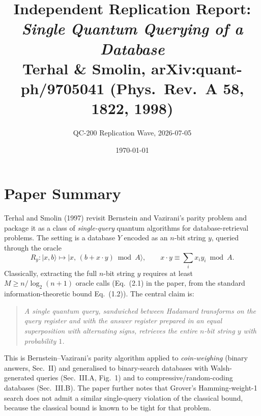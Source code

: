 \documentclass[11pt]{article}
\title{Independent Replication Report: \\
\emph{Single Quantum Querying of a Database} \\
Terhal \& Smolin, arXiv:quant-ph/9705041 (Phys.\ Rev.\ A \textbf{58}, 1822, 1998)}
\author{QC-200 Replication Wave, 2026-07-05}
\date{\today}
\begin{document}
\maketitle

\section{Paper Summary}
Terhal and Smolin (1997) revisit Bernstein and Vazirani's parity problem and
package it as a class of \emph{single-query} quantum algorithms for
database-retrieval problems. The setting is a database $Y$ encoded as an
$n$-bit string $y$, queried through the oracle
\begin{equation}
    R_y : |x,b\rangle \mapsto \bigl|x,\, (b + x\cdot y)\bmod A\bigr\rangle,
    \qquad x\cdot y \equiv \sum_i x_i y_i \bmod A .
\end{equation}
Classically, extracting the full $n$-bit string $y$ requires at least
$M \ge n/\log_2(n+1)$ oracle calls (Eq.~(2.1) in the paper, from the standard
information-theoretic bound Eq.~(1.2)). The central claim is:

\begin{quote}
\textit{A single quantum query, sandwiched between Hadamard transforms on the
query register and with the answer register prepared in an equal
superposition with alternating signs, retrieves the entire $n$-bit string $y$
with probability $1$.}
\end{quote}

This is Bernstein--Vazirani's parity algorithm applied to \emph{coin-weighing}
(binary answers, Sec.~II) and generalised to binary-search databases with
Walsh-generated queries (Sec.~III.A, Fig.~1) and to compressive/random-coding
databases (Sec.~III.B). The paper further notes that Grover's Hamming-weight-1
search does not admit a similar single-query violation of the classical bound,
because the classical bound is known to be tight for that problem.
\end{document}
